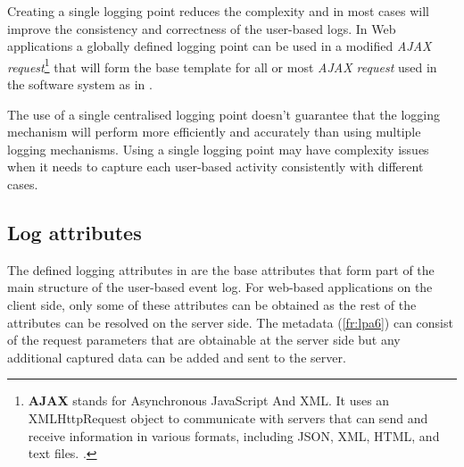 Creating a single logging point reduces the complexity and in most cases will improve the consistency and correctness of the user-based logs. In Web applications a globally defined logging point can be used in a modified \textit{AJAX request}\footnote{\textbf{AJAX} stands for Asynchronous JavaScript And XML. It uses an XMLHttpRequest object to communicate with servers that can send and receive information in various formats, including JSON, XML, HTML, and text files. \cite{Mozilla2022a}.} that will form the base template for all or most \textit{AJAX request} used in the software system as in .\par The use of a single centralised logging point doesn't guarantee that the logging mechanism will perform more efficiently and accurately than using multiple logging mechanisms. Using a single logging point may have complexity issues when it needs to capture each user-based activity consistently with different cases.

\subsection{Log attributes}\label{sec:ch2_logAttributes}
The defined logging attributes in  are the base attributes that form part of the main structure of the user-based event log. For web-based applications on the
client side, only some of these attributes can be obtained as the rest of the attributes can be resolved on the server side. The metadata (\ref{fr:lpa6}) can consist of the request parameters that are
obtainable at the server side but any additional captured data can be added and sent to the server.


